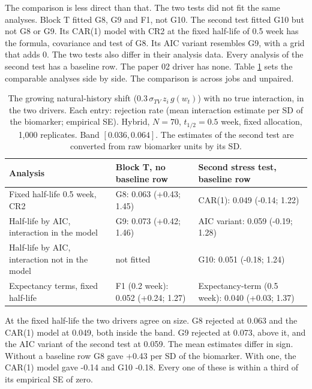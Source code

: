 \documentclass[
  11pt,
]{article}
\newcounter{none} %
\begin{document}
The comparison is less direct than that. The two tests did not fit
the same analyses. Block T fitted G8, G9 and F1, not G10. The second
test fitted G10 but not G8 or G9. Its CAR(1) model with CR2 at the
fixed half-life of 0.5 week has the formula, covariance and test of
G8. Its AIC variant resembles G9, with a grid that adds 0. The two
tests also differ in their analysis data. Every analysis of the
second test has a baseline row. The paper 02 driver has none. Table
\ref{tab:tab-reconcile} sets the comparable analyses side by side.
The comparison is across jobs and unpaired.

\begin{table}
\centering
\caption{\label{tab:tab-reconcile}The growing natural-history shift ($0.3\,
      \sigma_{TV}\,z_i\,g(w_t)$) with no true interaction, in the two
      drivers. Each entry: rejection rate (mean interaction estimate
      per SD of the biomarker; empirical SE). Hybrid, $N = 70$,
      $t_{1/2} = 0.5$ week, fixed allocation, 1,000 replicates. Band
      $[0.036, 0.064]$. The estimates of the second test are converted from raw
      biomarker units by its SD.}
\centering
\fontsize{8}{10}\selectfont
\begin{tabular}[t]{>{\raggedright\arraybackslash}p{4cm}>{\raggedright\arraybackslash}p{4.6cm}>{\raggedright\arraybackslash}p{4.6cm}}
\toprule
Analysis & Block T, no baseline row & Second stress test, baseline row\\
\midrule
Fixed half-life 0.5 week, CR2 & G8: 0.063 (+0.43; 1.45) & CAR(1): 0.049 (-0.14; 1.22)\\
Half-life by AIC, interaction in the model & G9: 0.073 (+0.42; 1.46) & AIC variant: 0.059 (-0.19; 1.28)\\
Half-life by AIC, interaction not in the model & not fitted & G10: 0.051 (-0.18; 1.24)\\
Expectancy terms, fixed half-life & F1 (0.2 week): 0.052 (+0.24; 1.27) & Expectancy-term (0.5 week): 0.040 (+0.03; 1.37)\\
\bottomrule
\end{tabular}
\end{table}

At the fixed half-life the two drivers agree on size. G8 rejected at
0.063 and the CAR(1) model at 0.049, both inside
the band. G9 rejected at 0.073, above it, and the AIC
variant of the second test at 0.059. The mean estimates
differ in sign. Without a baseline row G8 gave +0.43 per SD
of the biomarker. With one, the CAR(1) model gave -0.14 and
G10 -0.18. Every one of these is within a third of its
empirical SE of zero.
\end{document}
